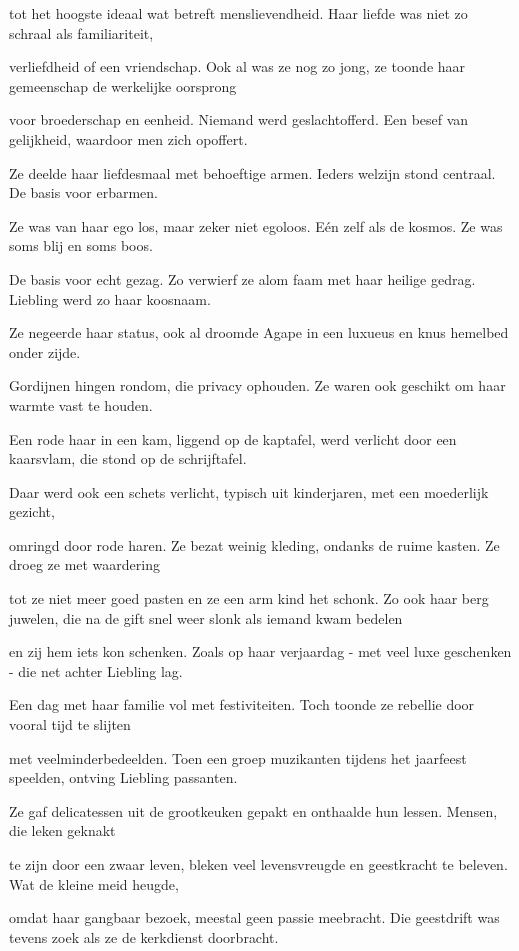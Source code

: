 tot het hoogste ideaal
wat betreft menslievendheid.
Haar liefde was niet zo schraal
als familiariteit,

verliefdheid of een vriendschap.
Ook al was ze nog zo jong,
ze toonde haar gemeenschap
de werkelijke oorsprong

voor broederschap en eenheid.
Niemand werd geslachtofferd.
Een besef van gelijkheid,
waardoor men zich opoffert.

Ze deelde haar liefdesmaal
met behoeftige armen.
Ieders welzijn stond centraal.
De basis voor erbarmen.

Ze was van haar ego los,
maar zeker niet egoloos.
Eén zelf als de kosmos.
Ze was soms blij en soms boos.

De basis voor echt gezag.
Zo verwierf ze alom faam
met haar heilige gedrag.
Liebling werd zo haar koosnaam.

Ze negeerde haar status,
ook al droomde Agape
in een luxueus en knus
hemelbed onder zijde.

Gordijnen hingen rondom,
die privacy ophouden.
Ze waren ook geschikt om
haar warmte vast te houden.

Een rode haar in een kam,
liggend op de kaptafel,
werd verlicht door een kaarsvlam,
die stond op de schrijftafel.

Daar werd ook een schets verlicht,
typisch uit kinderjaren,
met een moederlijk gezicht,

omringd door rode haren.
Ze bezat weinig kleding,
ondanks de ruime kasten.
Ze droeg ze met waardering

tot ze niet meer goed pasten
en ze een arm kind het schonk.
Zo ook haar berg juwelen,
die na de gift snel weer slonk
als iemand kwam bedelen

en zij hem iets kon schenken.
Zoals op haar verjaardag
- met veel luxe geschenken -
die net achter Liebling lag.

Een dag met haar familie
vol met festiviteiten.
Toch toonde ze rebellie
door vooral tijd te slijten

met veelminderbedeelden.
Toen een groep muzikanten
tijdens het jaarfeest speelden,
ontving Liebling passanten.

Ze gaf delicatessen
uit de grootkeuken gepakt
en onthaalde hun lessen. Mensen, die leken geknakt

te zijn door een zwaar leven,
bleken veel levensvreugde
en geestkracht te beleven.
Wat de kleine meid heugde,

omdat haar gangbaar bezoek,
meestal geen passie meebracht.
Die geestdrift was tevens zoek
als ze de kerkdienst doorbracht.

